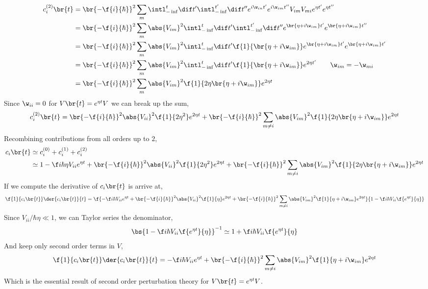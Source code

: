 \documentclass{article}
\begin{document}
\begin{align*}
    c_{i}^{(2)}\br{t}
    &= \br{-\f{i}{\hbar}}^2 \sum_{m} \intl_{-\inf}^{t} \dif t' \intl_{-\inf}^{t'} \dif t'' e^{i \w_{in} t'} e^{i \w_{im} t''} V_{im} V_{mi} e^{\eta t'} e^{\eta t''} \\
    &= \br{-\f{i}{\hbar}}^2 \sum_{m} \abs{V_{im}}^2 \intl_{-\inf}^{t} \dif t' \intl_{-\inf}^{t'} \dif t'' e^{\br{\eta + i\w_{im}} t'} e^{\br{\eta + i\w_{im}} t''}\\
    &= \br{-\f{i}{\hbar}}^2 \sum_{m} \abs{V_{im}}^2 \intl_{-\inf}^{t} \dif t' \f{1}{\br{\eta + i\w_{im}}}e^{\br{\eta + i\w_{im}} t'} e^{\br{\eta + i\w_{im}} t'}\\
    &= \br{-\f{i}{\hbar}}^2 \sum_{m} \abs{V_{im}}^2 \intl_{-\inf}^{t} \dif t' \f{1}{\br{\eta + i\w_{im}}}e^{2 \eta t'} \qquad \w_{im} = - \w_{mi}\\
    &= \br{-\f{i}{\hbar}}^2 \sum_{m} \abs{V_{im}}^2 \f{1}{2 \eta\br{\eta + i\w_{im}}}e^{2 \eta t}\\
\end{align*}
Since $\w_{ii} = 0$ for $V\br{t} = e^{\eta t} V$ we can break up the sum,
\[ c_{i}^{(2)}\br{t} = \br{-\f{i}{\hbar}}^2 \abs{V_{ii}}^2 \f{1}{2 \eta^2}e^{2 \eta t} + \br{-\f{i}{\hbar}}^2 \sum_{m \neq i} \abs{V_{im}}^2 \f{1}{2 \eta\br{\eta + i\w_{im}}}e^{2 \eta t} \]
Recombining contributions from all orders up to $2$,
\begin{align*}
    c_i\br{t}
    &\simeq c_i^{(0)} + c_i^{(1)} + c_i^{(2)} \\
    &\simeq 1 - \f i {\hbar \eta} V_{ii} e^{\eta t} + \br{-\f{i}{\hbar}}^2 \abs{V_{ii}}^2 \f{1}{2 \eta^2}e^{2 \eta t} + \br{-\f{i}{\hbar}}^2 \sum_{m \neq i} \abs{V_{im}}^2 \f{1}{2 \eta\br{\eta + i\w_{im}}}e^{2 \eta t}
\end{align*}
If we compute the derivative of $c_i\br{t}$ is arrive at,
\[ \f{1}{c_i\br{t}}\der{c_i\br{t}}{t} = \f{- \f i {\hbar} V_{ii} e^{\eta t} + \br{-\f{i}{\hbar}}^2 \abs{V_{ii}}^2 \f{1}{\eta}e^{2 \eta t} + \br{-\f{i}{\hbar}}^2 \sum_{m \neq i} \abs{V_{im}}^2 \f{1}{\eta + i\w_{im}}e^{2 \eta t}}{1 - \f i \hbar V_{ii} \f{e^{\eta t}}{\eta}} \]
Since $V_{ii} / \hbar \eta \ll 1$, we can Taylor series the denominator,
\[ \bs{1 - \f i \hbar V_{ii} \f{e^{\eta t}}{\eta}}^{-1} \simeq 1 + \f i \hbar V_{ii} \f{e^{\eta t}}{\eta} \]
And keep only second order terms in $V$,
\[ \f{1}{c_i\br{t}}\der{c_i\br{t}}{t} = - \f i {\hbar} V_{ii} e^{\eta t} + \br{-\f{i}{\hbar}}^2 \sum_{m \neq i} \abs{V_{im}}^2 \f{1}{\eta + i\w_{im}}e^{2 \eta t} \]
Which is the essential result of second order perturbation theory for $V\br{t} = e^{\eta t}V$.
\end{document}
